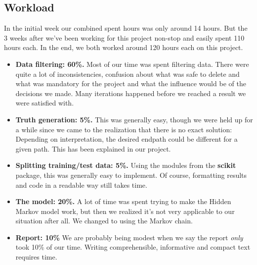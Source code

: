 \begin{appendices}

\section{Workload}

In the initial week our combined spent hours was only around 14 hours. But the 3 weeks after we've been working for this project non-stop and easily spent 110 hours each. In the end, we both worked around 120 hours each on this project.
\begin{itemize}
	\item \textbf{Data filtering: 60\%.} Most of our time was spent filtering data. There were quite a lot of inconsistencies, confusion about what was safe to delete and what was mandatory for the project and what the influence would be of the decisions we made. Many iterations happened before we reached a result we were satisfied with.
	\item \textbf{Truth generation: 5\%.} This was generally easy, though we were held up for a while since we came to the realization that there is no exact solution: Depending on interpretation, the desired endpath could be different for a given path. This has been explained in our project.
	\item \textbf{Splitting training/test data: 5\%.} Using the modules from the \textbf{scikit} package, this was generally easy to implement. Of course, formatting results and code in a readable way still takes time.
	\item \textbf{The model: 20\%.} A lot of time was spent trying to make the Hidden Markov model work, but then we realized it's not very applicable to our situation after all.  We changed to using the Markov chain.
	\item \textbf{Report: 10\%} We are probably being modest when we say the report \textit{only} took 10\% of our time. Writing comprehensible, informative and compact text requires time.
\end{itemize} 

\end{appendices}